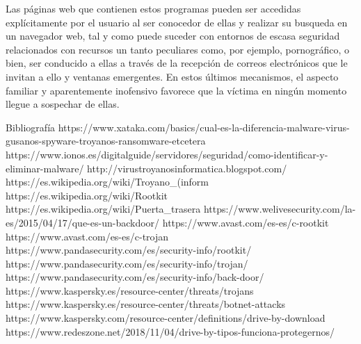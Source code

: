 		Las páginas web que contienen estos programas pueden ser accedidas explícitamente por el usuario al ser conocedor de ellas y realizar su busqueda en un navegador web, tal y como puede suceder con entornos de escasa seguridad relacionados con recursos un tanto peculiares como, por ejemplo, pornográfico, o bien, ser conducido a ellas a través de la recepción de correos electrónicos que le invitan a ello y ventanas emergentes. En estos últimos mecanismos, el aspecto familiar y aparentemente inofensivo favorece que la víctima en ningún momento llegue a sospechar de ellas.

Bibliografía
https://www.xataka.com/basics/cual-es-la-diferencia-malware-virus-gusanos-spyware-troyanos-ransomware-etcetera
https://www.ionos.es/digitalguide/servidores/seguridad/como-identificar-y-eliminar-malware/
http://virustroyanosinformatica.blogspot.com/
https://es.wikipedia.org/wiki/Troyano_(inform%
https://es.wikipedia.org/wiki/Rootkit
https://es.wikipedia.org/wiki/Puerta_trasera
https://www.welivesecurity.com/la-es/2015/04/17/que-es-un-backdoor/
https://www.avast.com/es-es/c-rootkit
https://www.avast.com/es-es/c-trojan
https://www.pandasecurity.com/es/security-info/rootkit/
https://www.pandasecurity.com/es/security-info/trojan/
https://www.pandasecurity.com/es/security-info/back-door/
https://www.kaspersky.es/resource-center/threats/trojans
https://www.kaspersky.es/resource-center/threats/botnet-attacks
https://www.kaspersky.com/resource-center/definitions/drive-by-download
https://www.redeszone.net/2018/11/04/drive-by-tipos-funciona-protegernos/